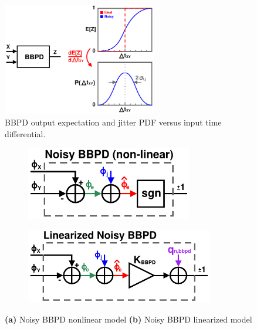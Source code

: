 		\begin{figure}[htb!]
		    \centering
			\includegraphics[width=0.6\textwidth, angle=0]{./figs/bbpd_jitter.pdf}
			\caption{BBPD output expectation and jitter PDF versus input time differential.}
			\label{fig:bbpd_jit_pdf}
		\end{figure}

	\begin{figure}[htb!]
	    \centering
	    \begin{subfigure}{0.5\textwidth}
	        \centering
	        \includegraphics[width=0.8\textwidth, angle=0]{figs/design/bbpd_noise_nonlinear}
	        \caption{ }
	        \label{fig:bbpd_noise_nonlinear}
	    \end{subfigure}%
	    \begin{subfigure}{0.5\textwidth}
	        \centering
	        \includegraphics[width=0.9\textwidth, angle=0]{figs/design/bbpd_noise_linear}
	        \caption{ }
	        \label{fig:bbpd_noise_linear}
	    \end{subfigure}
	    \caption{\textbf{(a)} Noisy BBPD nonlinear model \textbf{(b)} Noisy BBPD linearized model}
	     \label{fig:bbpd_noisy}
	\end{figure} 

